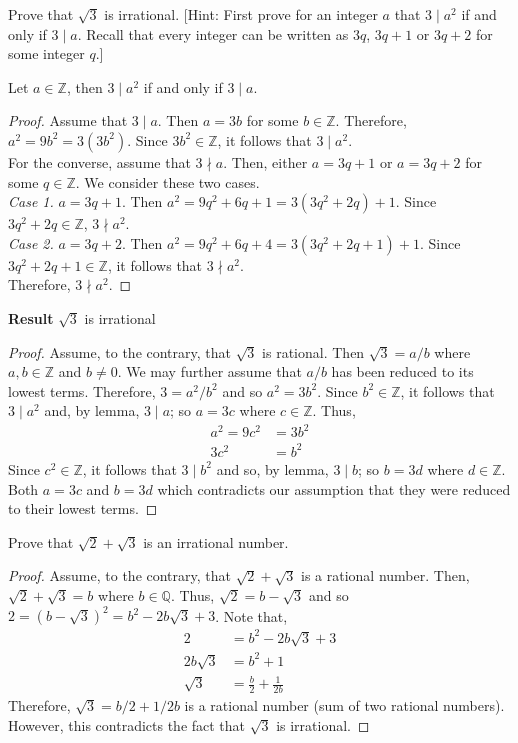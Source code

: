 \documentclass[12pt]{article}
\newcommand{\Z}{\mathbb{Z}}
\newcommand{\Q}{\mathbb{Q}}
\newenvironment{lemma}[2][Lemma]{\begin{trivlist}
		\item[\hskip \labelsep {\bfseries #1}\hskip \labelsep {\bfseries #2.}]}{\end{trivlist}}
\newenvironment{problem}[2][Problem]{\begin{trivlist}
		\item[\hskip \labelsep {\bfseries #1}\hskip \labelsep {\bfseries #2.}]}{\end{trivlist}}
\begin{document}
	\begin{problem}{19}
		Prove that $\sqrt{3}$ is irrational. [Hint: First prove for an integer $a$ that $3\mid a^{2}$ if and only if $3\mid a$. Recall that every integer can be written as $3q$, $3q+1$ or $3q+2$ for some integer $q$.]
		\begin{lemma}{1}
			Let $a\in\Z$, then $3\mid a^{2}$ if and only if $3\mid a$.
			\begin{proof}
				Assume that $3\mid a$. Then $a = 3b$ for some $b\in \Z$. Therefore, $a^{2} = 9b^{2} = 3(3b^{2})$. Since $3b^{2}\in \Z$, it follows that $3\mid a^{2}$.\\
				For the converse, assume that $3\nmid a$. Then, either $a = 3q+1$ or $a=3q+2$ for some $q\in \Z$. We consider these two cases.\\
				\textit{Case 1.} $a = 3q+1$. Then $a^{2} = 9q^{2} +6q +1 = 3(3q^{2}+2q)+1$. Since $3q^{2}+2q\in \Z$, $3\nmid a^{2}$.\\
				\textit{Case 2.} $a = 3q+2$. Then $a^{2} = 9q^{2} +6q +4 = 3(3q^{2}+2q+1)+1$. Since $3q^{2}+2q+1\in \Z$, it follows that $3\nmid a^{2}$.\\
				Therefore, $3\nmid a^{2}$.
			\end{proof}
		\end{lemma}
		\textbf{Result} $\sqrt{3}$ is irrational
		\begin{proof}
			Assume, to the contrary, that $\sqrt{3}$ is rational. Then $\sqrt{3} = a/b$ where $a,b\in \Z$ and $b\neq 0$. We may further assume that $a/b$ has been reduced to its lowest terms. Therefore, $3 = a^{2} / b^{2}$ and so $a^{2} = 3b^{2}$. Since $b^{2}\in \Z$, it follows that $3\mid a^{2}$ and, by lemma, $3\mid a$; so $a=3c$ where $c\in \Z$. Thus,
			\begin{align*}
				a^{2} = 9c^{2} &= 3b^{2}\\
				3c^{2} &= b^{2}
			\end{align*}
		Since $c^{2}\in \Z$, it follows that $3\mid b^{2}$ and so, by lemma, $3\mid b$; so $b=3d$ where $d\in \Z$. Both $a = 3c$ and $b = 3d$ which contradicts our assumption that they were reduced to their lowest terms.
		\end{proof}
	\end{problem}

	\begin{problem}{20}
		Prove that $\sqrt{2}+\sqrt{3}$ is an irrational number.
		\begin{proof}
			Assume, to the contrary, that $\sqrt{2} + \sqrt{3}$ is a rational number. Then, $\sqrt{2} + \sqrt{3} = b$ where $b \in \Q$. Thus, $\sqrt{2} = b - \sqrt{3}$ and so $2 = (b-\sqrt{3})^{2} = b^{2}-2b\sqrt{3}+3$. Note that,
			\begin{align*}
				2 &= b^{2}-2b\sqrt{3}+3\\
				2b\sqrt{3} &= b^{2} +1\\
				\sqrt{3} &= \frac{b}{2} + \frac{1}{2b}
			\end{align*}
		Therefore, $\sqrt{3} = b/2+1/2b$ is a rational number (sum of two rational numbers). However, this contradicts the fact that $\sqrt{3}$ is irrational.
		\end{proof}  
	\end{problem}
\end{document}
